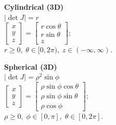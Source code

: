 \documentclass[8pt]{article}
\begin{document}
\hfill
\begin{minipage}[t]{0.27\textwidth}
    \centering
    \textbf{Cylindrical (3D)} \\[4pt]
    \(|\det J| = r\) \\[4pt]
    \(\displaystyle
    \begin{bmatrix}
    x \\[4pt]
    y \\[4pt]
    z
    \end{bmatrix}
    =
    \begin{bmatrix}
    r\cos\theta \\[4pt]
    r\sin\theta \\[4pt]
    z
    \end{bmatrix};
    \) \\[4pt]
    \( r \geq 0, \; \theta \in [0, 2\pi), \; z \in (-\infty, \infty) \).
\end{minipage}
\hfill
\begin{minipage}[t]{0.37\textwidth}
    \centering
    \textbf{Spherical (3D)} \\[4pt]
    \(|\det J| = \rho^2\sin\phi\) \\[4pt]
    \(\displaystyle
    \begin{bmatrix}
    x \\[4pt]
    y \\[4pt]
    z
    \end{bmatrix}
    =
    \begin{bmatrix}
    \rho\sin\phi\cos\theta \\[4pt]
    \rho\sin\phi\sin\theta \\[4pt]
    \rho\cos\phi
    \end{bmatrix};
    \) \\[4pt]
    \( \rho \geq 0, \; \phi \in [0, \pi], \; \theta \in [0, 2\pi] \).
\end{minipage}
\end{document}
